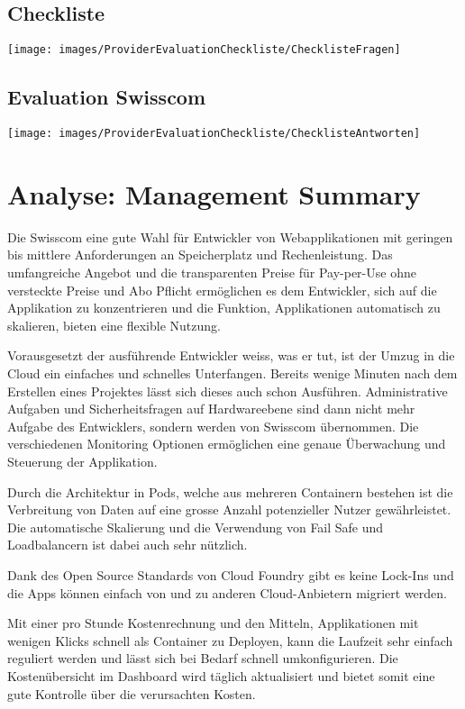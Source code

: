 \documentclass[11pt,titlepage]{article}
\begin{document}
\subsection{Checkliste}
\begin{center}
	\centering
	\texttt{[image: images/ProviderEvaluationCheckliste/ChecklisteFragen]}
	\label{fig:checklistefragen}
\end{center}
\subsection{Evaluation Swisscom}
\begin{center}
	\centering
	\texttt{[image: images/ProviderEvaluationCheckliste/ChecklisteAntworten]}
	\label{fig:checklisteantworten}
\end{center}

\section{Analyse: Management Summary}
\label{sec:analyseManagementSummary}

Die Swisscom eine gute Wahl für Entwickler von Webapplikationen mit geringen bis mittlere Anforderungen an Speicherplatz und Rechenleistung. Das umfangreiche
Angebot und die transparenten Preise für Pay-per-Use ohne versteckte Preise und Abo Pflicht ermöglichen es dem Entwickler, sich auf die Applikation zu konzentrieren und die Funktion, Applikationen automatisch zu skalieren, bieten eine flexible Nutzung.
\par
\vspace{5mm}
Vorausgesetzt der ausführende Entwickler weiss, was er tut, ist der Umzug in die Cloud ein einfaches und schnelles Unterfangen. Bereits wenige Minuten nach dem Erstellen eines Projektes lässt sich dieses auch schon Ausführen. Administrative Aufgaben und Sicherheitsfragen auf Hardwareebene sind dann nicht mehr Aufgabe des Entwicklers, sondern werden von Swisscom übernommen. Die verschiedenen Monitoring Optionen ermöglichen eine genaue Überwachung und Steuerung der Applikation.
\par
\vspace{5mm}
Durch die Architektur in Pods, welche aus mehreren Containern bestehen ist die Verbreitung von Daten auf eine grosse Anzahl potenzieller Nutzer gewährleistet. Die automatische Skalierung und die Verwendung von Fail Safe und Loadbalancern ist dabei auch sehr nützlich.
\par
\vspace{5mm}
Dank des Open Source Standards von Cloud Foundry gibt es keine Lock-Ins und die Apps können einfach von und zu anderen Cloud-Anbietern migriert werden.
\par
\vspace{5mm}
Mit einer pro Stunde Kostenrechnung und den Mitteln, Applikationen mit wenigen Klicks schnell
als Container zu Deployen, kann die Laufzeit sehr einfach reguliert werden und lässt sich bei Bedarf 
schnell umkonfigurieren. Die Kostenübersicht im Dashboard wird täglich aktualisiert und bietet somit eine gute Kontrolle über die verursachten Kosten.
\end{document}
